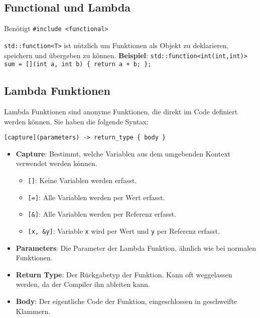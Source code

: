 \documentclass[10pt, a3paper, landscape]{article}
\newcommand{\algo}[1]{\textbf{\textcolor{blue!60!black}{#1}}}
\begin{document}
\begin{multicols*}{4}
\section{Functional und Lambda}

Benötigt \lstinline|#include <functional>|

\lstinline|std::function<T>| ist nützlich um Funktionen als Objekt zu deklarieren, speichern und übergeben zu können. \algo{Beispiel}: \newline
\lstinline|std::function<int(int,int)> sum = [](int a, int b) { return a + b; };|

\subsection*{Lambda Funktionen}

Lambda Funktionen sind anonyme Funktionen, die direkt im Code definiert werden können. Sie haben die folgende Syntax:

\lstinline|[capture](parameters) -> return_type { body }|

\begin{itemize}
    \item \textbf{Capture}: Bestimmt, welche Variablen aus dem umgebenden Kontext verwendet werden können.
    \begin{itemize}
        \item \lstinline|[]|: Keine Variablen werden erfasst.
        \item \lstinline|[=]|: Alle Variablen werden per Wert erfasst.
        \item \lstinline|[&]|: Alle Variablen werden per Referenz erfasst.
        \item \lstinline|[x, &y]|: Variable \lstinline|x| wird per Wert und \lstinline|y| per Referenz erfasst.
    \end{itemize}
    \item \textbf{Parameters}: Die Parameter der Lambda Funktion, ähnlich wie bei normalen Funktionen.
    \item \textbf{Return Type}: Der Rückgabetyp der Funktion. Kann oft weggelassen werden, da der Compiler ihn ableiten kann.
    \item \textbf{Body}: Der eigentliche Code der Funktion, eingeschlossen in geschweifte Klammern.
\end{itemize}












\end{multicols*}
\end{document}

